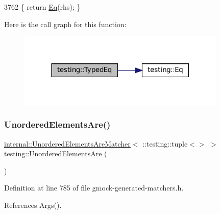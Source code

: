 \begin{DoxyCode}
3762 \{ \textcolor{keywordflow}{return} \hyperlink{namespacetesting_aa7771a34f092fd6f1dca2c82fb2a36a1}{Eq}(rhs); \}
\end{DoxyCode}
Here is the call graph for this function\+:
\nopagebreak
\begin{figure}[H]
\begin{center}
\leavevmode
\includegraphics[width=281pt]{namespacetesting_a57c9aba17aaa27d818e80a1eec81070f_cgraph}
\end{center}
\end{figure}
\mbox{\label{namespacetesting_a8622c12aadfa0e60f7d68683eeb21115}} 
\subsubsection{\texorpdfstring{Unordered\+Elements\+Are()}{UnorderedElementsAre()}\hspace{0.1cm}{\footnotesize\ttfamily [1/11]}}
{\footnotesize\ttfamily \hyperlink{classtesting_1_1internal_1_1UnorderedElementsAreMatcher}{internal\+::\+Unordered\+Elements\+Are\+Matcher}$<$ \+::testing\+::tuple$<$$>$ $>$ testing\+::\+Unordered\+Elements\+Are (\begin{DoxyParamCaption}{ }\end{DoxyParamCaption})\hspace{0.3cm}{\ttfamily [inline]}}



Definition at line 785 of file gmock-\/generated-\/matchers.\+h.



References Args().



